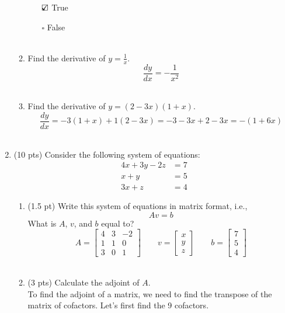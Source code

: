 \documentclass{./../../../Latex/tests}
\begin{document}
\begin{enumerate}
\begin{enumerate}
  \begin{itemize}
  	\item[$\text{\rlap{$\checkmark$}}\square$] True 
  	\item[$\square$] False \\~\\
  \end{itemize}  
  \item Find the derivative of $y = \frac{1}{x}$.
  $$ \frac{dy}{dx} =-\frac{1}{x^2} $$ \\
  \item Find the derivative of $y = (2-3x)(1+x)$.
  $$ \frac{dy}{dx} =-3(1+x)+1(2-3x) = -3-3x+2-3x = -(1+6x) $$ \\

\end{enumerate}

\newpage
\item (10 pts) Consider the following system of equations:
\begin{align*}
4 x + 3y -2z & = 7 \\
x+y & = 5 \\
3x+z &= 4	
\end{align*}
\begin{enumerate}
  \item (1.5 pt) Write this system of equations in matrix format, i.e., $$ Av=b $$
  What is $A$, $v$, and $b$ equal to?
$$ A = \begin{bmatrix}
	4 & 3 & -2 \\
	1 & 1 & 0 \\
	3 & 0 & 1 
\end{bmatrix} \quad \quad
v = \begin{bmatrix}
	x \\ y \\ z
\end{bmatrix} \quad \quad 
b = \begin{bmatrix}
	7 \\ 5 \\ 4
\end{bmatrix}$$ \\
   \item (3 pts) Calculate the adjoint of $A$. \\
    
To find the adjoint of a matrix, we need to find the transpose of the matrix of cofactors. Let's first find the 9 cofactors. \\


\end{enumerate}
\end{enumerate}
\end{document}

